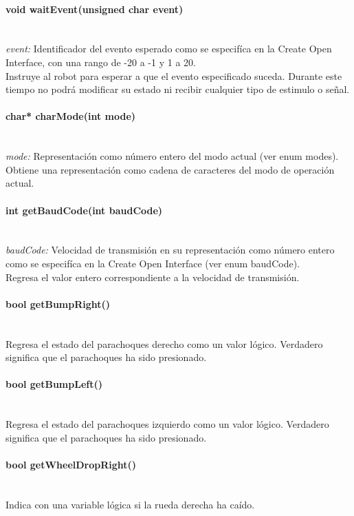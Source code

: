 \documentclass[letterpaper,openright,12pt]{book}
\begin{document}
\paragraph{void waitEvent(unsigned char event)}\mbox{}\\	
\emph{event: } Identificador del evento esperado como se especifíca en la Create Open Interface, con una rango de -20 a -1 y 1 a 20.\\
Instruye al robot para esperar a que el evento especificado suceda. Durante este tiempo no podrá modificar su estado ni recibir cualquier tipo de estimulo o señal.\\

\paragraph{char* charMode(int mode)}\mbox{}\\
\emph{mode: } Representación como número entero del modo actual (ver enum modes).\\
Obtiene una representación como cadena de caracteres del modo de operación actual.\\
\paragraph{int getBaudCode(int baudCode)}\mbox{}\\
\emph{baudCode: } Velocidad de transmisión en su representación como número entero como se especifíca en la Create Open Interface (ver enum baudCode).\\
Regresa el valor entero correspondiente a la velocidad de transmisión.\\

\paragraph{bool getBumpRight()}\mbox{}\\
Regresa el estado del parachoques derecho como un valor lógico. Verdadero significa que el parachoques ha sido presionado.\\
\paragraph{bool getBumpLeft()}\mbox{}\\
Regresa el estado del parachoques izquierdo como un valor lógico. Verdadero significa que el parachoques ha sido presionado.\\
\paragraph{bool getWheelDropRight()}\mbox{}\\
Indica con una variable lógica si la rueda derecha ha caído.\\
\end{document}
